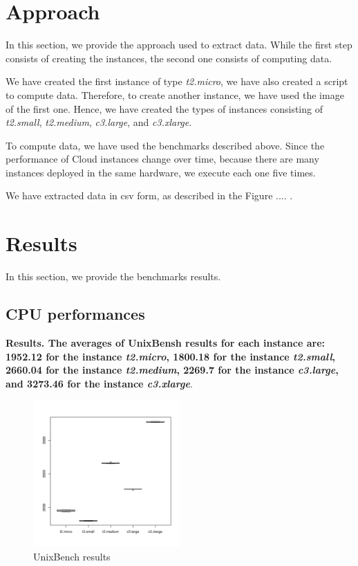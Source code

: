 \documentclass[10pt, conference]{IEEEtran}
\begin{document}
\section{Approach}
\label{sec:approach}

In this section, we provide the approach used to extract data. While the first step consists of creating the instances, the second one consists of computing data. 

We have created the first instance of type \textit{t2.micro}, we have also created a script to compute data. Therefore, to create another instance, we have used the image of the first one. Hence, we have created the types of instances consisting of \textit{t2.small}, \textit{t2.medium}, \textit{c3.large}, and \textit{c3.xlarge}.

To compute data, we have used the benchmarks described above. Since the performance of Cloud instances change over time, because there are many instances deployed in the same hardware, we execute each one five times.

We have extracted data in csv form, as described in the Figure .... .  

\section{Results}
\label{sec:results}

In this section, we provide the benchmarks results.

\subsection{CPU performances}

\textbf{Results. The averages of UnixBensh results for each instance are: 1952.12 for the instance \textit{t2.micro}, 1800.18 for the instance \textit{t2.small}, 2660.04 for the instance \textit{t2.medium}, 2269.7 for the instance \textit{c3.large}, and 3273.46 for the instance \textit{c3.xlarge}}.

\begin{figure}
\includegraphics[width=0.5\textwidth]{plots/UnixBench.pdf}
\caption{UnixBench results}
\label{fig:UnixBenchResult}
\end{figure}
\end{document}
